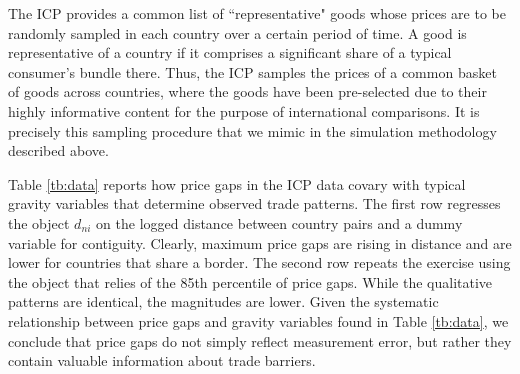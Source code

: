 \documentclass[12pt,dvips, ps2pdf]{article}
\begin{document}
The ICP provides a common list of ``representative" goods whose prices are to be randomly sampled in each country over a certain period of time. A good is representative of a country if it comprises a significant share of a typical consumer's bundle there. Thus, the ICP samples the prices of a common basket of goods across countries, where the goods have been pre-selected due to their highly informative content for the purpose of international comparisons. It is precisely this sampling procedure that we mimic in the simulation methodology described above.

Table \ref{tb:data} reports how price gaps in the ICP data covary with typical gravity variables that determine observed trade patterns. The first row regresses the object $d_{ni}$ on the logged distance between country pairs and a dummy variable for contiguity. Clearly, maximum price gaps are rising in distance and are lower for countries that share a border. The second row repeats the exercise using the object that relies of the 85th percentile of price gaps. While the qualitative patterns are identical, the magnitudes are lower. Given the systematic relationship between price gaps and gravity variables found in Table \ref{tb:data}, we conclude that price gaps do not simply reflect measurement error, but rather they contain valuable information about trade barriers.
\end{document}
